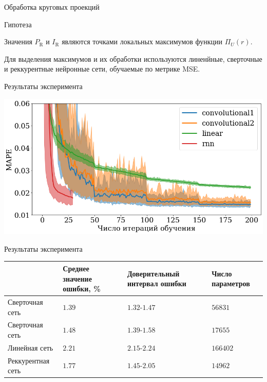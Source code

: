 \documentclass{beamer}
\begin{document}
\begin{frame}{Обработка круговых проекций}

\begin{block}{Гипотеза}

Значения $P_\text{R}$ и $I_\text{R}$ являются точками локальных максимумов функции $\Pi_U(r)$.

\end{block}

Для выделения максимумов и их обработки используются линенйные, сверточные и реккурентные нейронные сети, обучаемые по метрике MSE.

\end{frame}

\begin{frame}{Результаты эксперимента}

\includegraphics[scale=0.35]{img/mape.png}

\end{frame}

\begin{frame}{Результаты эксперимента}

\begin{center}

\begin{tabular}{|m{2.2cm}|m{1.9cm}|m{3cm}|m{1.9cm}|}

\hline

& Среднее значение ошибки, \% & Доверительный интервал ошибки & Число параметров\\
\hline

Сверточная сеть & $1.39$ & $1.32$-$1.47$ & $56831$\\
\hline
Сверточная сеть & $1.48$ & $1.39$-$1.58$ & $17655$\\
\hline
Линейная сеть & $2.21$ & $2.15$-$2.24$ & $166402$\\
\hline
Реккурентная сеть & $1.77$ & $1.45$-$2.05$ & $14962$\\
\hline
\end{tabular}

\end{center}

\end{frame}
\end{document}

